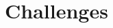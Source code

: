 \documentclass[Main]{subfiles}
\begin{document}
\section{Challenges} %
\label{sec:challenges}

\end{document}
